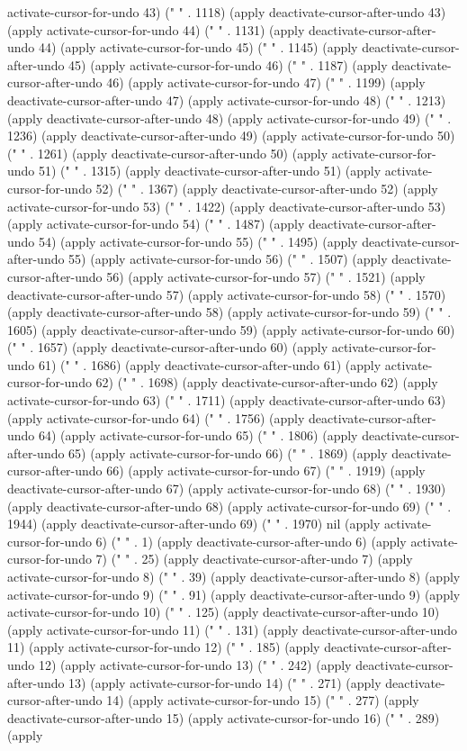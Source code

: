 activate-cursor-for-undo 43) (" " . 1118) (apply deactivate-cursor-after-undo 43) (apply activate-cursor-for-undo 44) (" " . 1131) (apply deactivate-cursor-after-undo 44) (apply activate-cursor-for-undo 45) (" " . 1145) (apply deactivate-cursor-after-undo 45) (apply activate-cursor-for-undo 46) (" " . 1187) (apply deactivate-cursor-after-undo 46) (apply activate-cursor-for-undo 47) (" " . 1199) (apply deactivate-cursor-after-undo 47) (apply activate-cursor-for-undo 48) (" " . 1213) (apply deactivate-cursor-after-undo 48) (apply activate-cursor-for-undo 49) (" " . 1236) (apply deactivate-cursor-after-undo 49) (apply activate-cursor-for-undo 50) (" " . 1261) (apply deactivate-cursor-after-undo 50) (apply activate-cursor-for-undo 51) (" " . 1315) (apply deactivate-cursor-after-undo 51) (apply activate-cursor-for-undo 52) (" " . 1367) (apply deactivate-cursor-after-undo 52) (apply activate-cursor-for-undo 53) (" " . 1422) (apply deactivate-cursor-after-undo 53) (apply activate-cursor-for-undo 54) (" " . 1487) (apply deactivate-cursor-after-undo 54) (apply activate-cursor-for-undo 55) (" " . 1495) (apply deactivate-cursor-after-undo 55) (apply activate-cursor-for-undo 56) (" " . 1507) (apply deactivate-cursor-after-undo 56) (apply activate-cursor-for-undo 57) (" " . 1521) (apply deactivate-cursor-after-undo 57) (apply activate-cursor-for-undo 58) (" " . 1570) (apply deactivate-cursor-after-undo 58) (apply activate-cursor-for-undo 59) (" " . 1605) (apply deactivate-cursor-after-undo 59) (apply activate-cursor-for-undo 60) (" " . 1657) (apply deactivate-cursor-after-undo 60) (apply activate-cursor-for-undo 61) (" " . 1686) (apply deactivate-cursor-after-undo 61) (apply activate-cursor-for-undo 62) (" " . 1698) (apply deactivate-cursor-after-undo 62) (apply activate-cursor-for-undo 63) (" " . 1711) (apply deactivate-cursor-after-undo 63) (apply activate-cursor-for-undo 64) (" " . 1756) (apply deactivate-cursor-after-undo 64) (apply activate-cursor-for-undo 65) (" " . 1806) (apply deactivate-cursor-after-undo 65) (apply activate-cursor-for-undo 66) (" " . 1869) (apply deactivate-cursor-after-undo 66) (apply activate-cursor-for-undo 67) (" " . 1919) (apply deactivate-cursor-after-undo 67) (apply activate-cursor-for-undo 68) (" " . 1930) (apply deactivate-cursor-after-undo 68) (apply activate-cursor-for-undo 69) (" " . 1944) (apply deactivate-cursor-after-undo 69) (" " . 1970) nil (apply activate-cursor-for-undo 6) (" " . 1) (apply deactivate-cursor-after-undo 6) (apply activate-cursor-for-undo 7) (" " . 25) (apply deactivate-cursor-after-undo 7) (apply activate-cursor-for-undo 8) (" " . 39) (apply deactivate-cursor-after-undo 8) (apply activate-cursor-for-undo 9) (" " . 91) (apply deactivate-cursor-after-undo 9) (apply activate-cursor-for-undo 10) (" " . 125) (apply deactivate-cursor-after-undo 10) (apply activate-cursor-for-undo 11) (" " . 131) (apply deactivate-cursor-after-undo 11) (apply activate-cursor-for-undo 12) (" " . 185) (apply deactivate-cursor-after-undo 12) (apply activate-cursor-for-undo 13) (" " . 242) (apply deactivate-cursor-after-undo 13) (apply activate-cursor-for-undo 14) (" " . 271) (apply deactivate-cursor-after-undo 14) (apply activate-cursor-for-undo 15) (" " . 277) (apply deactivate-cursor-after-undo 15) (apply activate-cursor-for-undo 16) (" " . 289) (apply 